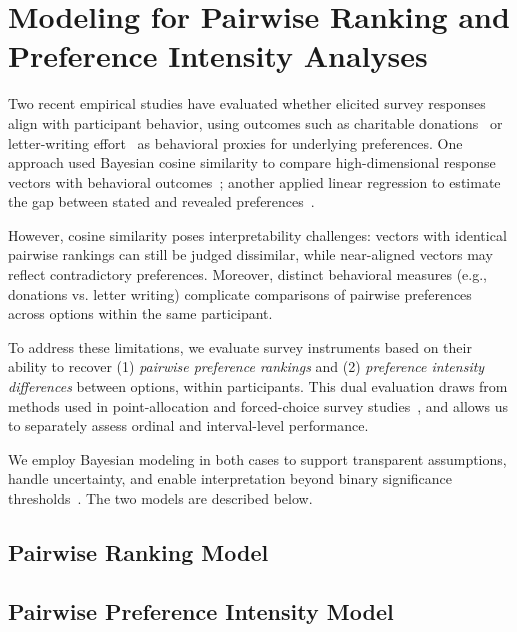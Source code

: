 \section{Modeling for Pairwise Ranking and Preference Intensity Analyses}
\label{sec:quantitative_measures}
Two recent empirical studies have evaluated whether elicited survey responses align with participant behavior, using outcomes such as charitable donations~\cite{chengCanShowWhat2021, cavaille2024cares} or letter-writing effort~\cite{cavaille2024cares} as behavioral proxies for underlying preferences. One approach used Bayesian cosine similarity to compare high-dimensional response vectors with behavioral outcomes~\cite{chengCanShowWhat2021}; another applied linear regression to estimate the gap between stated and revealed preferences~\cite{cavaille2024cares}.

However, cosine similarity poses interpretability challenges: vectors with identical pairwise rankings can still be judged dissimilar, while near-aligned vectors may reflect contradictory preferences. Moreover, distinct behavioral measures (e.g., donations vs. letter writing) complicate comparisons of pairwise preferences across options within the same participant.

To address these limitations, we evaluate survey instruments based on their ability to recover (1) \textit{pairwise preference rankings} and (2) \textit{preference intensity differences} between options, within participants. This dual evaluation draws from methods used in point-allocation and forced-choice survey studies~\cite{collewet2023preference}, and allows us to separately assess ordinal and interval-level performance. 

We employ Bayesian modeling in both cases to support transparent assumptions, handle uncertainty, and enable interpretation beyond binary significance thresholds~\cite{mcelreath2018statistical, kay2016researcher}. The two models are described below.

\subsection{Pairwise Ranking Model}
\label{sec:ordinal_measures}


\subsection{Pairwise Preference Intensity Model}
\label{sec:interval_measures}
